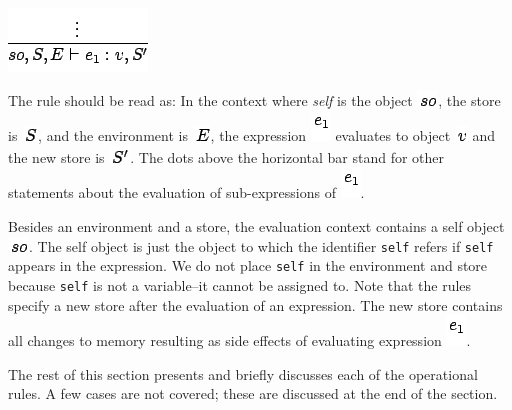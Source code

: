 \documentclass[]{article}
\begin{document}
\includegraphics{img155.png}

The rule should be read as: In the context where \emph{self} is the
object \includegraphics{img156.png}, the store is
\includegraphics{img129.png}, and the environment is
\includegraphics{img125.png}, the expression \includegraphics{img76.png}
evaluates to object \includegraphics{img59.png} and the new store is
\includegraphics{img126.png}. The dots above the horizontal bar stand
for other statements about the evaluation of sub-expressions of
\includegraphics{img76.png}.

Besides an environment and a store, the evaluation context contains a
self object \includegraphics{img156.png}. The self object is just the
object to which the identifier \texttt{self} refers if \texttt{self}
appears in the expression. We do not place \texttt{self} in the
environment and store because \texttt{self} is not a variable--it cannot
be assigned to. Note that the rules specify a new store after the
evaluation of an expression. The new store contains all changes to
memory resulting as side effects of evaluating expression
\includegraphics{img76.png}.

The rest of this section presents and briefly discusses each of the
operational rules. A few cases are not covered; these are discussed at
the end of the section. \\
\end{document}
